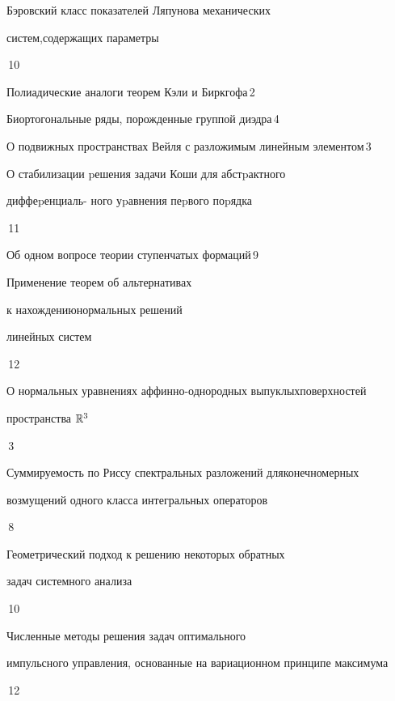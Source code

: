 {Бэровский класс показателей Ляпунова механических 


систем,\newline содержащих параметры}{\No\,10}




{Полиадические аналоги теорем Кэли и Биркгофа}{\No\,2}




{Биортогональные ряды, порожденные группой диэдра}{\No\,4}




{О подвижных пространствах Вейля с разложимым линейным элементом}{\No\,3}




{О стабилизации pешения задачи Коши для абстpактного


диффеpенциаль- \newline ного уpавнения пеpвого поpядка}{\No\,11}




{Об одном вопросе теории ступенчатых формаций}{\No\,9}




{Применение теорем об альтернативах


к нахождению\newline нормальных решений


линейных систем}{\No\,12}




{О нормальных уравнениях аффинно-однородных выпуклых\newline поверхностей


пространства $\Bbb R^3$}{\No\,3}




{Суммируемость по Риссу спектральных разложений для\newline конечномерных


возмущений одного класса интегральных операторов}{\No\,8}




{Геометрический подход к решению некоторых обратных \newline


задач системного анализа}{\No\,10}




{Численные методы решения задач оптимального\newline


импульсного управления, основанные на вариационном принципе максимума}{\No\,12}


